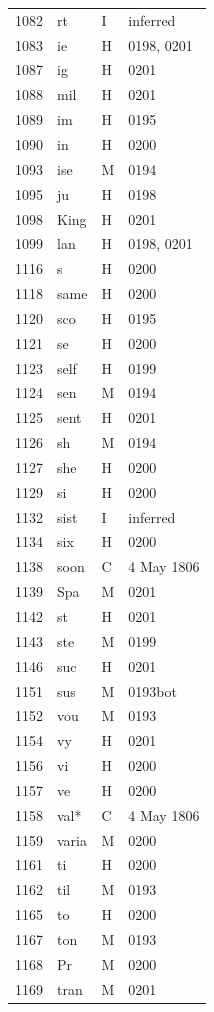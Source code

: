 \begin{longtable}{@{}rlll@{}}
1082 & rt & I & inferred \\
1083 & ie & H & 0198, 0201 \\
1087 & ig & H & 0201 \\
1088 & mil & H & 0201 \\
1089 & im & H & 0195 \\
1090 & in & H & 0200 \\
1093 & ise & M & 0194 \\
1095 & ju & H & 0198 \\
1098 & King & H & 0201 \\
1099 & lan & H & 0198, 0201 \\
1116 & s & H & 0200 \\
1118 & same & H & 0200 \\
1120 & sco & H & 0195 \\
1121 & se & H & 0200 \\
1123 & self & H & 0199 \\
1124 & sen & M & 0194 \\
1125 & sent & H & 0201 \\
1126 & sh & M & 0194 \\
1127 & she & H & 0200 \\
1129 & si & H & 0200 \\
1132 & sist & I & inferred \\
1134 & six & H & 0200 \\
1138 & soon & C & 4 May 1806 \\
1139 & Spa & M & 0201 \\
1142 & st & H & 0201 \\
1143 & ste & M & 0199 \\
1146 & suc & H & 0201 \\
1151 & sus & M & 0193bot \\
1152 & vou & M & 0193 \\
1154 & vy & H & 0201 \\
1156 & vi & H & 0200 \\
1157 & ve & H & 0200 \\
1158 & val* & C & 4 May 1806 \\
1159 & varia & M & 0200 \\
1161 & ti & H & 0200 \\
1162 & til & M & 0193 \\
1165 & to & H & 0200 \\
1167 & ton & M & 0193 \\
1168 & Pr & M & 0200 \\
1169 & tran & M & 0201 \\

\end{longtable}
